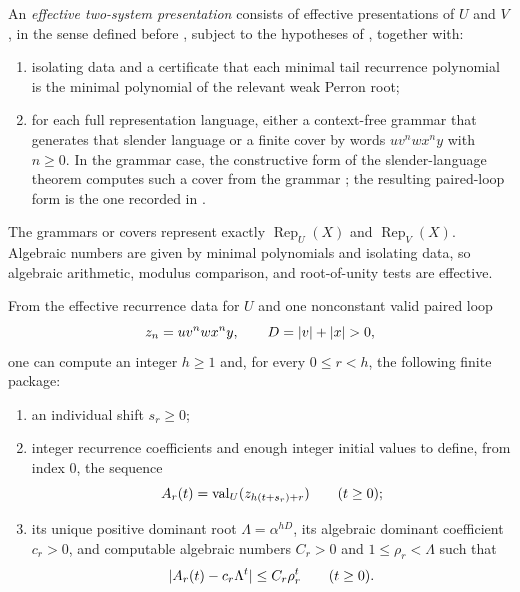 \begin{definition}
  \label{def:effective-two-system-presentation}
  An \emph{effective two-system presentation} consists of effective
  presentations of \(U\) and \(V\), in the sense defined before
  , subject to the
  hypotheses of , together with:
  \begin{enumerate}[label=\textup{(\roman*)}]
    \item isolating data and a certificate that each minimal tail recurrence
      polynomial is the minimal polynomial of the relevant weak Perron root;
    \item for each full representation language, either a context-free
      grammar that generates that slender language or a finite cover by words
      \(
        u v^n w x^n y
      \)
      with \(n\ge0\). In the grammar case, the constructive form of the
      slender-language theorem computes such a cover from the grammar
      \cite{LatteuxThierrin1983,Ilie1994}; the resulting paired-loop form is
      the one recorded in \cite[Theorem~7]{IlieRozenbergSalomaa2000}.
  \end{enumerate}
  The grammars or covers represent exactly \(\operatorname{Rep}_U(X)\) and
  \(\operatorname{Rep}_V(X)\). Algebraic numbers are given by minimal
  polynomials and isolating data, so algebraic arithmetic, modulus
  comparison, and root-of-unity tests are effective.
\end{definition}

\begin{lemma}
  \label{lem:effective-paired-loop-transfer}
  From the effective recurrence data for \(U\) and one nonconstant valid
  paired loop
  \[
    z_n=u v^n w x^n y,\qquad D=\lvert v \rvert+\lvert x \rvert>0,
  \]
  one can compute an integer \(h\ge1\) and, for every \(0\le r<h\), the
  following finite package:
  \begin{enumerate}[label=\textup{(\alph*)}]
    \item an individual shift \(s_r\ge0\);
    \item integer recurrence coefficients and enough integer initial values
      to define, from index \(0\), the sequence
      \[
        A_r(t)=\operatorname{val}_U(z_{h(t+s_r)+r})\qquad(t\ge0);
      \]
    \item its unique positive dominant root
      \(\Lambda=\alpha^{hD}\), its algebraic dominant coefficient
      \(c_r>0\), and computable algebraic numbers
      \(C_r>0\) and \(1\le\rho_r<\Lambda\) such that
      \begin{equation}
        \lvert A_r(t)-c_r\Lambda^t \rvert\le C_r\rho_r^t
        \qquad(t\ge0).
        \label{eq:effective-loop-error}
      \end{equation}
  \end{enumerate}
\end{lemma}

